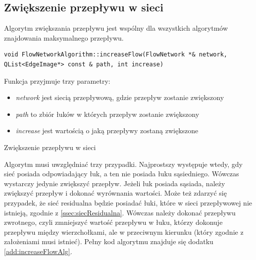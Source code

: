 \subsection{Zwiększenie przepływu w sieci}\label{ssec:zwiekszeniePrzeplywuAlg}
Algorytm zwiększania przepływu jest wspólny dla wszystkich algorytmów znajdowania maksymalnego przepływu.
\begin{verbatim}
void FlowNetworkAlgorithm::increaseFlow(FlowNetwork *& network, QList<EdgeImage*> const & path, int increase)
\end{verbatim}
Funkcja przyjmuje trzy parametry:
\begin{itemize}
	\item \emph{network} jest siecią przepływową, gdzie przepływ zostanie zwiększony
	\item \emph{path} to zbiór łuków w których przepływ zostanie zwiększony
	\item \emph{increase} jest wartością o jaką przepływy zostaną zwiększone
\end{itemize}
\begin{algorithm}[H]
	\caption{Zwiększenie przepływu w sieci}\label{zwiekszenieParzeplywuAlg}
	\begin{algorithmic}
				\Else{}
				\EndIf
			\EndFor
		\EndProcedure
	\end{algorithmic}
\end{algorithm}
Algorytm musi uwzględniać trzy przypadki. Najprostszy występuje wtedy, gdy sieć posiada odpowiadający łuk, a ten nie posiada łuku sąsiedniego. Wówczas wystarczy jedynie zwiększyć przepływ. Jeżeli łuk posiada sąsiada, należy zwiększyć przepływ i dokonać wyrównania wartości. Może też zdarzyć się przypadek, że sieć residualna będzie posiadać łuki, które w sieci przepływowej nie istnieją, zgodnie z \ref{ssec:siecResidualna}. Wówczas należy dokonać przepływu zwrotnego, czyli zmniejszyć wartość przepływu w łuku, którzy dokonuje przepływu między wierzchołkami, ale w przeciwnym kierunku (który zgodnie z założeniami musi istnieć). Pełny kod algorytmu znajduje się dodatku \ref{add:increaseFlowAlg}.

